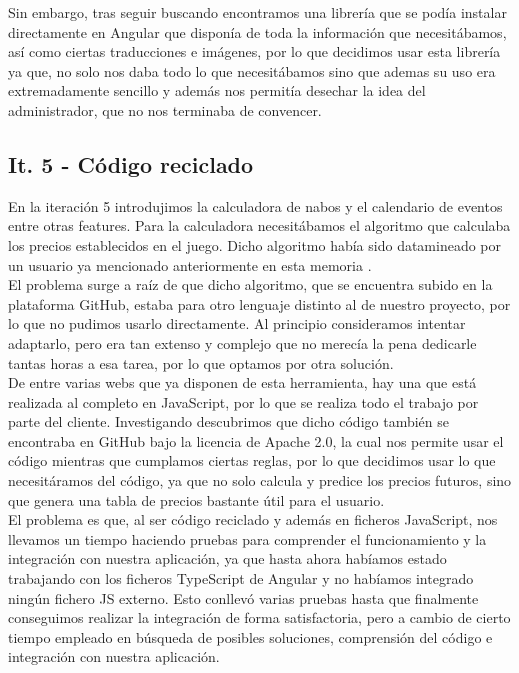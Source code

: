 Sin embargo, tras seguir buscando encontramos una librería \citep{acnhnpm} que se podía instalar directamente en Angular que disponía de toda la información que necesitábamos, así como ciertas traducciones e imágenes, por lo que decidimos usar esta librería ya que, no solo nos daba todo lo que necesitábamos sino que ademas su uso era extremadamente sencillo y además nos permitía desechar la idea del administrador, que no nos terminaba de convencer.

\subsection{It. 5 - Código reciclado}

En la iteración 5 introdujimos la calculadora de nabos y el calendario de eventos entre otras features. Para la calculadora necesitábamos el algoritmo que calculaba los precios establecidos en el juego. Dicho algoritmo había sido datamineado por un usuario ya mencionado anteriormente en esta memoria \citep{nabosninji}.\\

El problema surge a raíz de que dicho algoritmo, que se encuentra subido en la plataforma GitHub, estaba para otro lenguaje distinto al de nuestro proyecto, por lo que no pudimos usarlo directamente. Al principio consideramos intentar adaptarlo, pero era tan extenso y complejo que no merecía la pena dedicarle tantas horas a esa tarea, por lo que optamos por otra solución.\\

De entre varias webs que ya disponen de esta herramienta, hay una \citep{turnipprophet} que está realizada al completo en JavaScript, por lo que se realiza todo el trabajo por parte del cliente. Investigando descubrimos que dicho código también se encontraba en GitHub bajo la licencia de Apache 2.0, la cual nos permite usar el código mientras que cumplamos ciertas reglas, por lo que decidimos usar lo que necesitáramos del código, ya que no solo calcula y predice los precios futuros, sino que genera una tabla de precios bastante útil para el usuario.\\

El problema es que, al ser código reciclado y además en ficheros JavaScript, nos llevamos un tiempo haciendo pruebas para comprender el funcionamiento y la integración con nuestra aplicación, ya que hasta ahora habíamos estado trabajando con los ficheros TypeScript de Angular y no habíamos integrado ningún fichero JS externo. Esto conllevó varias pruebas hasta que finalmente conseguimos realizar la integración de forma satisfactoria, pero a cambio de cierto tiempo empleado en búsqueda de posibles soluciones, comprensión del código e integración con nuestra aplicación.\\

